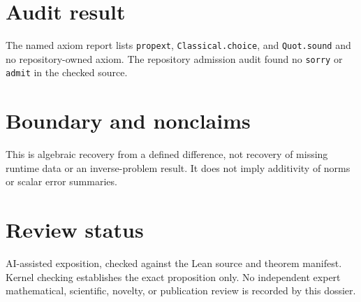 \documentclass[11pt]{article}
\begin{document}
\section{Audit result}
The named axiom report lists \texttt{propext}, \texttt{Classical.choice}, and
\texttt{Quot.sound} and no repository-owned axiom. The repository admission audit found no
\texttt{sorry} or \texttt{admit} in the checked source.

\section{Boundary and nonclaims}
This is algebraic recovery from a defined difference, not recovery of missing runtime data or an
inverse-problem result. It does not imply additivity of norms or scalar error summaries.

\section{Review status}
AI-assisted exposition, checked against the Lean source and theorem manifest. Kernel checking
establishes the exact proposition only. No independent expert mathematical, scientific,
novelty, or publication review is recorded by this dossier.
\end{document}

